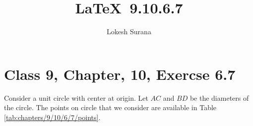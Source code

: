 \documentclass[journal,12pt,twocolumn]{IEEEtran}
\begin{document}
\vspace{3cm}
\title{\LaTeX\ 9.10.6.7}
\author{Lokesh Surana}
\maketitle
\section*{Class 9, Chapter, 10, Exercse 6.7}


\solution
\fi
Consider a unit circle with center at origin.
Let $AC$ and $BD$ be the diameters of the circle.
The points on circle that we consider are available in Table \eqref{tab:chapters/9/10/6/7/points}.
%
\begin{table}[ht!]

\caption{}
\label{tab:chapters/9/10/6/7/points}
\end{table}
%
\end{document}
